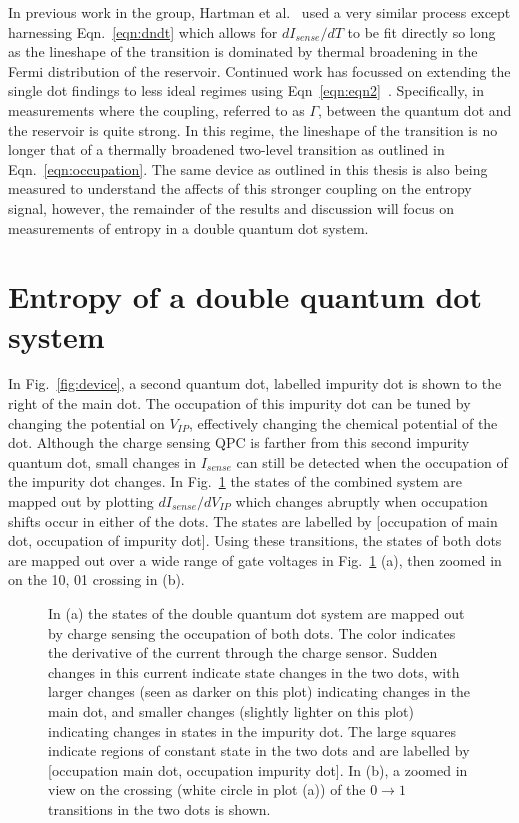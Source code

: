 In previous work in the group, Hartman et al.~\cite{nikentropy} used a very similar process except harnessing Eqn.~\ref{eqn:dndt} which allows for $dI_{sense}/dT$ to be fit directly so long as the lineshape of the transition is dominated by thermal broadening in the Fermi distribution of the reservoir. Continued work has focussed on extending the single dot findings to less ideal regimes using Eqn~\ref{eqn:eqn2}~\cite{child2020entropy}. Specifically, in measurements where the coupling, referred to as $\Gamma$, between the quantum dot and the reservoir is quite strong. In this regime, the lineshape of the transition is no longer that of a thermally broadened two-level transition as outlined in Eqn.~\ref{eqn:occupation}. The same device as outlined in this thesis is also being measured to understand the affects of this stronger coupling on the entropy signal, however, the remainder of the results and discussion will focus on measurements of entropy in a double quantum dot system.

\section{Entropy of a double quantum dot system}
\label{sec:dqd}

In Fig.~\ref{fig:device}, a second quantum dot, labelled impurity dot is shown to the right of the main dot. The occupation of this impurity dot can be tuned by changing the potential on $V_{IP}$, effectively changing the chemical potential of the dot. Although the charge sensing \ac{QPC} is farther from this second impurity quantum dot, small changes in $I_{sense}$ can still be detected when the occupation of the impurity dot changes. In Fig.~\ref{fig:qdpanel2} the states of the combined system are mapped out by plotting $dI_{sense}/dV_{IP}$ which changes abruptly when occupation shifts occur in either of the dots. The states are labelled by [occupation of main dot, occupation of impurity dot]. Using these transitions, the states of both dots are mapped out over a wide range of gate voltages in Fig.~\ref{fig:qdpanel2} (a), then zoomed in on the 10, 01 crossing in (b).

\begin{figure}[h]
\centering
{}
\caption{In (a) the states of the double quantum dot system are mapped out by charge sensing the occupation of both dots. The color indicates the derivative of the current through the charge sensor. Sudden changes in this current indicate state changes in the two dots, with larger changes (seen as darker on this plot) indicating changes in the main dot, and smaller changes (slightly lighter on this plot) indicating changes in states in the impurity dot. The large squares indicate regions of constant state in the two dots and are labelled by [occupation main dot, occupation impurity dot]. In (b), a zoomed in view on the crossing (white circle in plot (a)) of the $0 \to 1$ transitions in the two dots is shown.}
\label{fig:qdpanel2}       %
\end{figure}

